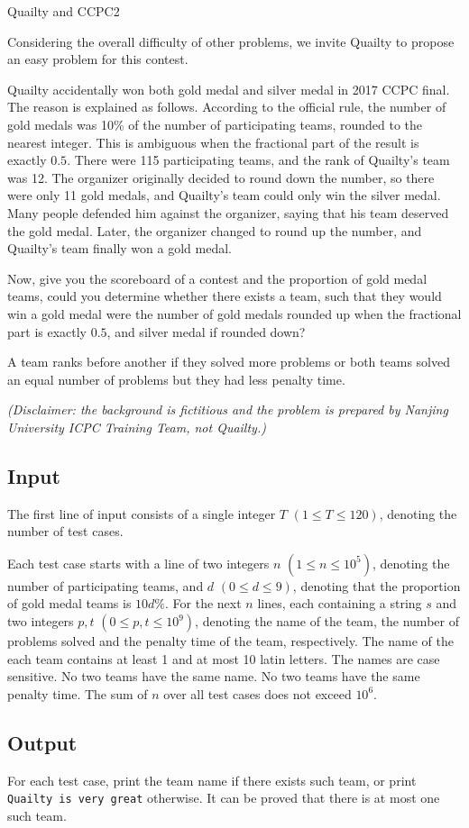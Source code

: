 \begin{Problem}{Quailty and CCPC}{2}

Considering the overall difficulty of other problems, we invite Quailty to propose an easy problem for this contest.

Quailty accidentally won both gold medal and silver medal in 2017 CCPC final. The reason is explained as follows. According to the official rule, the number of gold medals was 10\% of the number of participating teams, rounded to the nearest integer. This is ambiguous when the fractional part of the result is exactly $0.5$. There were 115 participating teams, and the rank of Quailty's team was 12. The organizer originally decided to round down the number, so there were only 11 gold medals, and Quailty's team could only win the silver medal. Many people defended him against the organizer, saying that his team deserved the gold medal. Later, the organizer changed to round up the number, and Quailty's team finally won a gold medal.

Now, give you the scoreboard of a contest and the proportion of gold medal teams, could you determine whether there exists a team, such that they would win a gold medal were the number of gold medals rounded up when the fractional part is exactly $0.5$, and silver medal if rounded down?

A team ranks before another if they solved more problems or both teams solved an equal number of problems but they had less penalty time.

\textit{(Disclaimer: the background is fictitious and the problem is prepared by Nanjing University ICPC Training Team, not Quailty.)}

\subsection*{Input}

The first line of input consists of a single integer $T$ $(1 \leq T \leq 120)$, denoting the number of test cases.

Each test case starts with a line of two integers $n$ $(1 \leq n \leq 10^5)$, denoting the number of participating teams, and $d$ $(0 \leq d \leq 9)$, denoting that the proportion of gold medal teams is $10d\%$. For the next $n$ lines, each containing a string $s$ and two integers $p, t$ $(0 \leq p, t \leq 10^9)$, denoting the name of the team, the number of problems solved and the penalty time of the team, respectively. The name of the each team contains at least 1 and at most 10 latin letters. The names are case sensitive. No two teams have the same name. No two teams have the same penalty time. The sum of $n$ over all test cases does not exceed $10^6$.

\subsection*{Output}

For each test case, print the team name if there exists such team, or print \texttt{Quailty is very great} otherwise. It can be proved that there is at most one such team.


\end{Problem}
